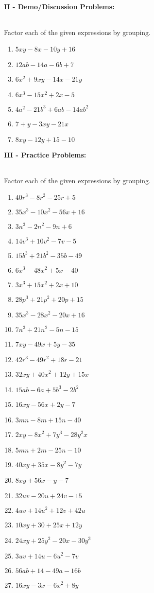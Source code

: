 \documentclass[12pt]{article}
\theoremstyle{definition}
\begin{document}
{\bf II - Demo/Discussion Problems:}\\
\ \par
Factor each of the given expressions by grouping.
\begin{multicols}{2}
\begin{enumerate}
	\item $5xy-8x-10y+16$
	\item $12ab-14a-6b+7$
	\item $6 x^2 + 9 x y - 14 x - 21 y$
	\item $6 x^3 - 15 x^2 + 2 x - 5$
	\item $4 a^2 - 21 b^3 + 6 a b - 14 a b^2$
	\item $7 + y - 3 x y - 21 x$
	\item $8 x y - 12 y + 15 - 10$
\end{enumerate}
\end{multicols}
\newpage
{\bf III - Practice Problems:}\\
\ \par
Factor each of the given expressions by grouping.
\begin{multicols}{2}
  \begin{enumerate}
	\item $40 r^3 - 8 r^2 - 25 r + 5$
  \item $35 x^3 - 10 x^2 - 56 x + 16$
  \item $3 n^3 - 2 n^2 - 9 n + 6$
  \item $14 v^3 + 10 v^2 - 7 v - 5$
  \item $15 b^3 + 21 b^2 - 35 b - 49$
  \item $6 x^3 - 48 x^2 + 5 x - 40$
  \item $3 x^3 + 15 x^2 + 2 x + 10$
  \item $28 p^3 + 21 p^2 + 20 p + 15$
  \item $35 x^3 - 28 x^2 - 20 x + 16$
  \item $7 n^3 + 21 n^2 - 5 n - 15$
  \item $7 x y - 49 x + 5 y - 35$
  \item $42 r^3 - 49 r^2 + 18 r - 21$
  \item $32 x y + 40 x^2 + 12 y + 15 x$
  \item $15 a b - 6 a + 5 b^3 - 2 b^2$
  \item $16 x y - 56 x + 2 y - 7$
  \item $3 m n - 8 m + 15 n - 40$
  \item $2 x y - 8 x^2 + 7 y^3 - 28 y^2 x$
  \item $5 m n + 2 m - 25 n - 10$
  \item $40 x y + 35 x - 8 y^2 - 7 y$
  \item $8 x y + 56 x - y - 7$
  \item $32 u v - 20 u + 24 v - 15$
  \item $4 u v + 14 u^2 + 12 v + 42 u$
  \item $10 x y + 30 + 25 x + 12 y$
  \item $24 x y + 25 y^2 - 20 x - 30 y^3$
  \item $3 u v + 14 u - 6 u^2 - 7 v$
  \item $56 a b + 14 - 49 a - 16 b$
  \item $16 x y - 3 x - 6 x^2 + 8 y$
	\end{enumerate}
\end{multicols}
\newpage
\ \newpage
\end{document}
